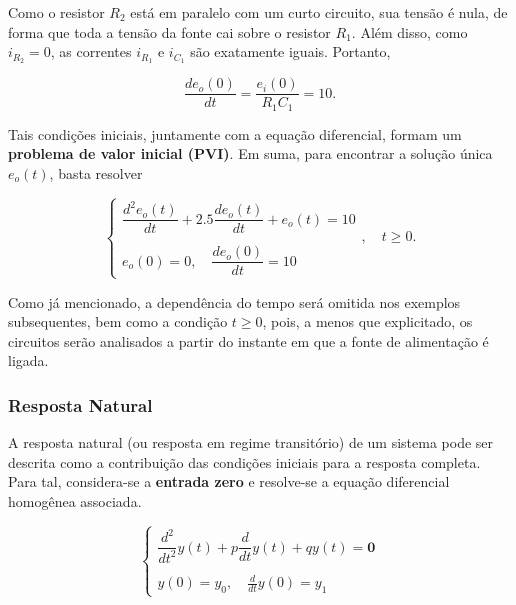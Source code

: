 \documentclass{article}
\numberwithin{equation}{section}
\let\dfr\dfrac
\begin{document}
\noindent Como o resistor $R_2$ está em paralelo com um curto circuito, sua tensão é nula, de forma que toda a tensão da fonte cai sobre o resistor $R_1$. Além disso, como $i_{R_2}=0$, as correntes $i_{R_1}$ e $i_{C_1}$ são exatamente iguais. Portanto,

\begin{equation*}
    \dfr{de_o(0)}{dt} = \dfr{e_i(0)}{R_1C_1} = 10.
\end{equation*}

\vspace{2mm}

\noindent Tais condições iniciais, juntamente com a equação diferencial, formam um \textbf{problema de valor inicial (PVI)}. Em suma, para encontrar a solução única $e_o(t)$, basta resolver

\begin{equation}
    \begin{cases}
        \dfr{ d^2e_o(t) }{ dt }+ 2.5 \dfr{ de_o(t) }{ dt } + e_o(t) = 10\\ \\
        e_o(0) = 0, \quad \dfr{de_o(0)}{dt}=10
    \end{cases} \label{eq:pvi}
    , \quad t \geqslant 0.
\end{equation}

\noindent Como já mencionado, a dependência do tempo será omitida nos exemplos subsequentes, bem como a condição $t \geqslant 0$, pois, a menos que explicitado, os circuitos serão analisados a partir do instante em que a fonte de alimentação é ligada.

\subsubsection{Resposta Natural}
\label{subsubsec:natural}
A resposta natural (ou resposta em regime transitório) de um sistema pode ser descrita como a contribuição das condições iniciais para a resposta completa. Para tal, considera-se a \textbf{entrada zero} e resolve-se a equação diferencial homogênea associada.

\begin{equation}
    \begin{cases}
        \dfr{d^2}{dt^2}y(t)+p\dfr{d}{dt}y(t)+qy(t)=\textbf{0}\\ \\
        \displaystyle{y(0)=y_{0}, \quad \frac{d}{dt}y(0)=y_{1}}
    \end{cases} \label{eq:natural_generica}
\end{equation}
\end{document}
